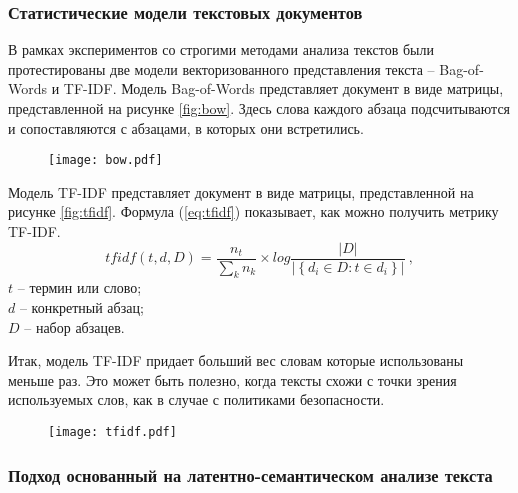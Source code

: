 \documentclass[../main]{subfiles}
\begin{document}
\subsubsection{Статистические модели текстовых документов}

В рамках экспериментов со строгими методами анализа текстов были протестированы две модели векторизованного представления текста -- Bag-of-Words и TF-IDF. Модель Bag-of-Words представляет документ в виде матрицы, представленной на рисунке \ref{fig:bow}. Здесь слова каждого абзаца подсчитываются и сопоставляются с абзацами, в которых они встретились.

\begin{figure}[H]
    \centering
    {\texttt{[image: bow.pdf]}}
    \vspace{-\baselineskip}
\end{figure}

Модель TF-IDF представляет документ в виде матрицы, представленной на рисунке \ref{fig:tfidf}. Формула (\ref{eq:tfidf}) показывает, как можно получить метрику TF-IDF.
\begin{equation}
    \label{eq:tfidf}
    tfidf(t, d, D) = \frac{n_t}{\displaystyle\sum_k n_k} \times 
    log \frac{ \big|{D}\big| }
    { \big|\left\{ d_i \in D : t \in d_i \right\}\big| }\ ,
\end{equation}
$t$ -- термин или слово;\\
\makebox[1.25cm]{}$d$ -- конкретный абзац;\\
\makebox[1.25cm]{}$D$ -- набор абзацев. 

Итак, модель TF-IDF придает больший вес словам которые использованы меньше раз. Это может быть полезно, когда тексты схожи с точки зрения используемых слов, как в случае с политиками безопасности.

\begin{figure}[H]
    \centering
    {\texttt{[image: tfidf.pdf]}}
    \vspace{-\baselineskip}
\end{figure}

\subsubsection{Подход основанный на латентно-семантическом анализе текста}
\end{document}
